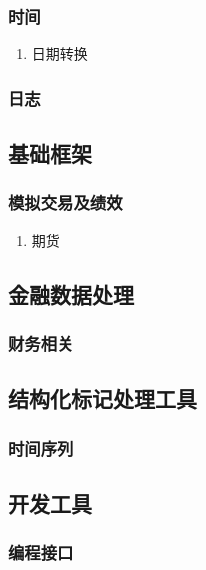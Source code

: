 \documentclass[11pt]{article}
\begin{document}
\subsubsection{时间}
\label{sec:orgheadline134}
\begin{enumerate}
\item 日期转换
\label{sec:orgheadline133}
\end{enumerate}
\subsubsection{日志}
\label{sec:orgheadline135}
\subsection{基础框架}
\label{sec:orgheadline139}

\subsubsection{模拟交易及绩效}
\label{sec:orgheadline138}

\begin{enumerate}
\item 期货
\label{sec:orgheadline137}
\end{enumerate}

\subsection{金融数据处理}
\label{sec:orgheadline141}

\subsubsection{财务相关}
\label{sec:orgheadline140}
\subsection{结构化标记处理工具}
\label{sec:orgheadline143}
\subsubsection{时间序列}
\label{sec:orgheadline142}
\subsection{开发工具}
\label{sec:orgheadline145}
\subsubsection{编程接口}
\label{sec:orgheadline144}
\end{document}
